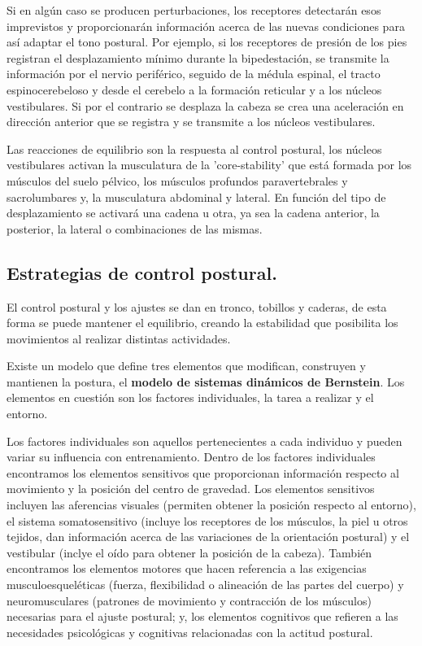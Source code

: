 Si en algún caso se producen perturbaciones, los receptores detectarán esos imprevistos y proporcionarán información acerca de las nuevas condiciones para así adaptar el tono postural. Por ejemplo, si los receptores de presión de los pies registran el desplazamiento mínimo durante la bipedestación, se transmite la información por el nervio periférico, seguido de la médula espinal, el tracto espinocerebeloso y desde el cerebelo a la formación reticular y a los núcleos vestibulares. Si por el contrario se desplaza la cabeza se crea una aceleración en dirección anterior que se registra y se transmite a los núcleos vestibulares. 

Las reacciones de equilibrio son la respuesta al control postural, los núcleos vestibulares activan la musculatura de la 'core-stability' que está formada por los músculos del suelo pélvico, los músculos profundos paravertebrales y sacrolumbares y, la musculatura abdominal y lateral. En función del tipo de desplazamiento se activará una cadena u otra, ya sea la cadena anterior, la posterior, la lateral o combinaciones de las mismas.

\subsection{Estrategias de control postural.} 
El control postural y los ajustes se dan en tronco, tobillos y caderas, de esta forma se puede mantener el equilibrio, creando la estabilidad que posibilita los movimientos al realizar distintas actividades.

Existe un modelo que define tres elementos que modifican, construyen y mantienen la postura, el \textbf{modelo de sistemas dinámicos de Bernstein}. Los elementos en cuestión son los factores individuales, la tarea a realizar y el entorno. 

Los factores individuales son aquellos pertenecientes a cada individuo y pueden variar su influencia con entrenamiento. Dentro de los factores individuales encontramos los elementos sensitivos que proporcionan información respecto al movimiento y la posición del centro de gravedad. Los elementos sensitivos incluyen las aferencias visuales (permiten obtener la posición respecto al entorno), el sistema somatosensitivo (incluye los receptores de los músculos, la piel u otros tejidos, dan información acerca de las variaciones de la orientación postural) y el vestibular (inclye el oído para obtener la posición de la cabeza). También encontramos los elementos motores que hacen referencia a las exigencias musculoesqueléticas (fuerza, flexibilidad o alineación de las partes del cuerpo) y neuromusculares (patrones de movimiento y contracción de los músculos)  necesarias para el ajuste postural; y, los elementos cognitivos que refieren a las necesidades psicológicas y cognitivas relacionadas con la actitud postural.

